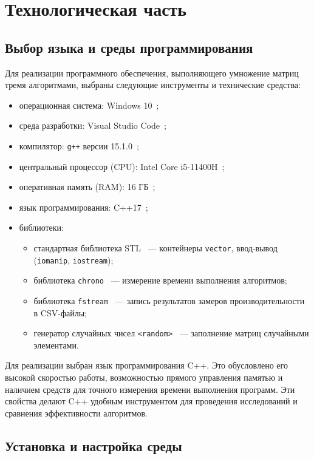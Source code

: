 \chapter{Технологическая часть}

\section{Выбор языка и среды программирования}

Для реализации программного обеспечения, выполняющего умножение матриц тремя алгоритмами, выбраны следующие инструменты и технические средства:

\begin{itemize}
	\item операционная система: Windows 10~\cite{lit4};
	\item среда разработки: Visual Studio Code~\cite{lit5};
	\item компилятор: \texttt{g++} версии 15.1.0~\cite{lit6};
	\item центральный процессор (CPU): Intel Core i5-11400H~\cite{lit7};
	\item оперативная память (RAM): 16 ГБ~\cite{lit8};
	\item язык программирования: C++17~\cite{lit9};
	\item библиотеки:
	\begin{itemize}
		\item стандартная библиотека STL~\cite{lit10} — контейнеры \texttt{vector}, ввод-вывод (\texttt{iomanip}, \texttt{iostream});
		\item библиотека \texttt{chrono}~\cite{lit11} — измерение времени выполнения алгоритмов;
		\item библиотека \texttt{fstream}~\cite{lit12} — запись результатов замеров производительности в CSV-файлы;
		\item генератор случайных чисел \texttt{<random>}~\cite{lit13} — заполнение матриц случайными элементами.
	\end{itemize}
\end{itemize}

Для реализации выбран язык программирования C++. Это обусловлено его высокой скоростью работы, возможностью прямого управления памятью и наличием средств для точного измерения времени выполнения программ. Эти свойства делают C++ удобным инструментом для проведения исследований и сравнения эффективности алгоритмов.

\section{Установка и настройка среды}


